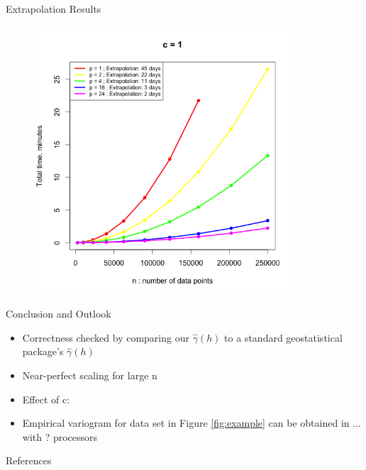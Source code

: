 \documentclass[serif,mathserif,final]{beamer}
\begin{document}
\begin{frame}{}
\begin{columns}[t]
    \begin{column}{0.32\linewidth}

      \begin{block}{Extrapolation Results}
        \begin{figure}[htbp]
            \centering
            \includegraphics[height=10cm]{comm_c1_timings.png} %
            \label{fig:plot}
         \end{figure}
      \end{block}

      \begin{block}{Conclusion and Outlook}
        \begin{itemize}
         \item Correctness checked by comparing our $\hat{\gamma}(h)$ to a standard geostatistical package's $\hat{\gamma}(h)$
         \item Near-perfect scaling for large n
         \item Effect of c:
         \item Empirical variogram for data set in Figure \ref{fig:example} can be obtained in ... with ? processors
        \end{itemize}
      \end{block}

      \begin{block}{References}
        
	{\footnotesize
	}
      \end{block}

    \end{column}%

  \end{columns}
\end{frame}
\end{document}
